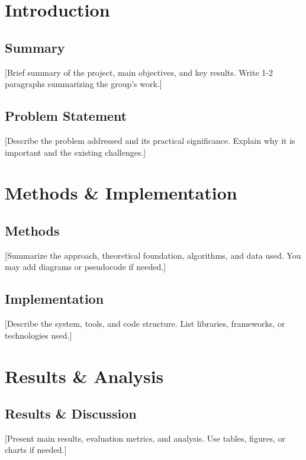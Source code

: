 \documentclass[a4paper]{book}
\begin{document}
\listoffigures %

\listoftables %

\tableofcontents
\clearpage

\chapter{Introduction}

\section{Summary}
[Brief summary of the project, main objectives, and key results. Write 1-2 paragraphs summarizing the group's work.]

\section{Problem Statement}
[Describe the problem addressed and its practical significance. Explain why it is important and the existing challenges.]

\chapter{Methods \& Implementation}

\section{Methods}
[Summarize the approach, theoretical foundation, algorithms, and data used. You may add diagrams or pseudocode if needed.]

\section{Implementation}
[Describe the system, tools, and code structure. List libraries, frameworks, or technologies used.]

\chapter{Results \& Analysis}

\section{Results \& Discussion}
[Present main results, evaluation metrics, and analysis. Use tables, figures, or charts if needed.]
\end{document}
